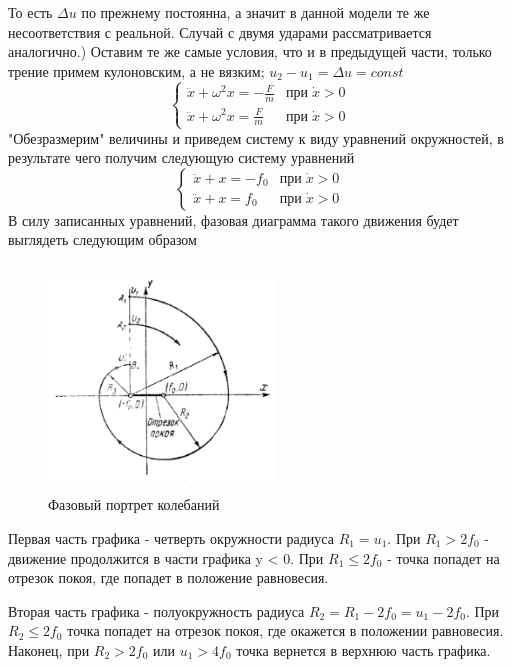 \documentclass[12pt,a4paper]{article}
\begin{document}
То есть $\Delta{u}$ по прежнему постоянна, а значит в данной модели те же несоответствия с реальной. Случай с двумя ударами рассматривается аналогично.\hfill {}) Оставим те же самые условия, что и в предыдущей части, только трение примем кулоновским, а не вязким; $u_{2}-u_{1}=\Delta{u}=const$
\begin{equation*}
 \begin{cases}
   \ddot{x}+\omega^{2}x=-\frac{F}{m} &\text{при}\; \dot{x}>0\\
   \ddot{x}+\omega^{2}x=\frac{F}{m} &\text{при}\; \dot{x}>0
 \end{cases}
\end{equation*}
"Обезразмерим" величины и приведем систему к виду уравнений окружностей, в результате чего получим следующую систему уравнений
\begin{equation*}
 \begin{cases}
   \ddot{x}+x=-f_{0} &\text{при}\; \dot{x}>0\\
   \ddot{x}+x=f_{0} &\text{при}\; \dot{x}>0
 \end{cases}
\end{equation*}
В силу записанных уравнений, фазовая диаграмма такого движения будет выглядеть следующим образом
\begin{figure}[H]
\centering
\includegraphics[width=6cm, height=6cm]{ВПВ_2}
\caption{Фазовый портрет колебаний}
\label{pic:1}
\end{figure}
\par Первая часть графика - четверть окружности радиуса $R_{1}=u_{1}$. При $R_{1} > 2f_{0}$ - движение продолжится в части графика y < 0. При $R_{1} \leqslant 2f_{0}$ - точка попадет на отрезок покоя, где попадет в положение равновесия.
\par Вторая часть графика - полуокружность радиуса $R_{2}=R_{1}-2f_{0}=u_{1}-2f_{0}$. При $R_{2} \leqslant 2f_{0}$ точка попадет на отрезок покоя, где окажется в положении равновесия. Наконец, при $R_{2} > 2f_{0}$ или $u_{1} > 4f_{0}$ точка вернется в верхнюю часть графика.
\end{document}
